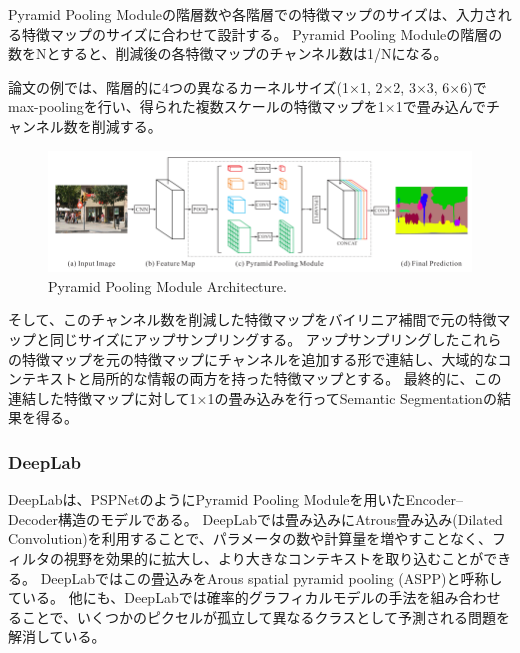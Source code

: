     Pyramid Pooling Moduleの階層数や各階層での特徴マップのサイズは、入力される特徴マップのサイズに合わせて設計する。
    Pyramid Pooling Moduleの階層の数をNとすると、削減後の各特徴マップのチャンネル数は1/Nになる。
    
    論文の例では、階層的に4つの異なるカーネルサイズ(1×1, 2×2, 3×3, 6×6)でmax-poolingを行い、得られた複数スケールの特徴マップを1×1で畳み込んでチャンネル数を削減する。
    \begin{figure}[ht]
      \centering
      \includegraphics[width=15cm]{8_appendix/img/PyramidPoolingModule}
      \caption{Pyramid Pooling Module Architecture\cite{zhao2017pyramid}.}
      \label{fig:unet_architecture}
    \end{figure}
    
    そして、このチャンネル数を削減した特徴マップをバイリニア補間で元の特徴マップと同じサイズにアップサンプリングする。
    アップサンプリングしたこれらの特徴マップを元の特徴マップにチャンネルを追加する形で連結し、大域的なコンテキストと局所的な情報の両方を持った特徴マップとする。
    最終的に、この連結した特徴マップに対して1×1の畳み込みを行ってSemantic Segmentationの結果を得る。

\subsubsection{DeepLab}
    DeepLab\cite{chen2014semantic, chen2017deeplab}は、PSPNetのようにPyramid Pooling Moduleを用いたEncoder–Decoder構造のモデルである。
    DeepLabでは畳み込みにAtrous畳み込み(Dilated Convolution)を利用することで、パラメータの数や計算量を増やすことなく、フィルタの視野を効果的に拡大し、より大きなコンテキストを取り込むことができる。
    DeepLabではこの畳込みをArous spatial pyramid pooling (ASPP)と呼称している。
    他にも、DeepLabでは確率的グラフィカルモデルの手法を組み合わせることで、いくつかのピクセルが孤立して異なるクラスとして予測される問題を解消している。

